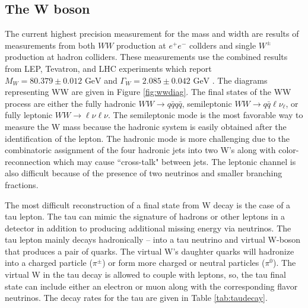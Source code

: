 
\subsection{The W boson}
\label{subsec:std_model}

 The current highest precision measurement for the mass and width are results of measurements from both $WW$ production at $e^+ e^-$ collders and single $W^\pm$ production at hadron colliders. These measurements use the combined results from LEP, Tevatron, and LHC experiments which report $M_W = 80.379 \pm 0.012 \, \, \text{GeV} $ and $\Gamma_W = 2.085 \pm 0.042 \,  \,\text{GeV}$ \cite{pdg}. The diagrams representing WW are given in Figure \ref{fig:wwdiag}. The final states of the WW process are either the fully hadronic $WW\rightarrow q\bar{q}q\bar{q}$, semileptonic $WW\rightarrow q\bar{q}\ell\nu_{\ell}$, or fully leptonic $WW\rightarrow \ell \nu \ell \nu$. The semileptonic mode is the most favorable way to measure the W mass because the hadronic system is easily obtained after the identification of the lepton. The hadronic mode is more challenging due to the combinatoric assignment of the four hadronic jets into two W's along with color-reconnection which may cause ``cross-talk" between jets. The leptonic channel is also difficult because of the presence of two neutrinos and smaller branching fractions.

  The most difficult reconstruction of a final state from W decay is the case of a tau lepton. The tau can mimic the signature of hadrons or other leptons in a detector in addition to producing additional missing energy via neutrinos.  The tau lepton mainly decays hadronically -- into a tau neutrino and virtual W-boson that produces a pair of quarks. The virtual W's daughter quarks will hadronize into a charged particle ($\pi^\pm$) or form more charged or neutral particles ($\pi^0$). The virtual W in the tau decay is allowed to couple with leptons, so, the tau final state can include either an electron or muon along with the corresponding flavor neutrinos. The decay rates for the tau are given in Table \ref{tab:taudecay}.

